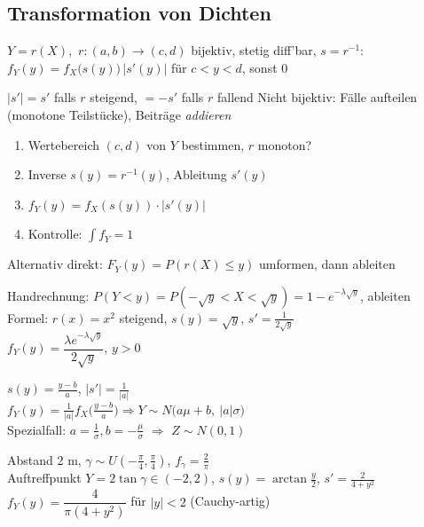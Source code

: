 \subsection{Transformation von Dichten}
\begin{formel}
$Y=r(X)$,\ $r:(a,b)\to(c,d)$ bijektiv, stetig diff'bar, $s=r^{-1}$:\\[1pt]
$f_Y(y)=f_X\big(s(y)\big)\,|s'(y)|$ für $c<y<d$, sonst 0
\end{formel}
\begin{itemize}
\pfeil $|s'|=s'$ falls $r$ steigend, $=-s'$ falls $r$ fallend
\pfeil Nicht bijektiv: Fälle aufteilen (monotone Teilstücke), Beiträge \emph{addieren}
\end{itemize}
\begin{merke}[{{Rechenschema}}]
\begin{enumerate}[label=\arabic*.,leftmargin=*]
\item Wertebereich $(c,d)$ von $Y$ bestimmen, $r$ monoton?
\item Inverse $s(y)=r^{-1}(y)$, Ableitung $s'(y)$
\item $f_Y(y)=f_X(s(y))\cdot|s'(y)|$
\item Kontrolle: $\int f_Y=1$
\end{enumerate}
\begin{itemize}
\pfeil Alternativ direkt: $F_Y(y)=P(r(X)\le y)$ umformen, dann ableiten
\end{itemize}
\end{merke}
\begin{bsp}[{{$Y=X^2$, $X\sim$ Exp$(\lambda)$ (4.3.4, 4.3.6)}}]
Handrechnung: $P(Y<y)=P(-\sqrt y<X<\sqrt y)=1-e^{-\lambda\sqrt y}$, ableiten\\
Formel: $r(x)=x^2$ steigend, $s(y)=\sqrt y$, $s'=\frac1{2\sqrt y}$\\
$f_Y(y)=\dfrac{\lambda e^{-\lambda\sqrt y}}{2\sqrt y}$, $y>0$
\end{bsp}
\begin{bsp}[{{Affin: $X\sim N(\mu,\sigma)$, $Y=aX+b$ (4.3.7)}}]
$s(y)=\frac{y-b}a$, $|s'|=\frac1{|a|}$\\
$f_Y(y)=\frac1{|a|}f_X\big(\tfrac{y-b}a\big)\Rightarrow Y\sim N\big(a\mu+b,\ |a|\sigma\big)$\\
Spezialfall: $a=\frac1\sigma,b=-\frac\mu\sigma$ $\Rightarrow$ $Z\sim N(0,1)$
\end{bsp}
\begin{bsp}
Abstand 2 m, $\gamma\sim U(-\frac\pi4,\frac\pi4)$, $f_\gamma=\frac2\pi$\\
Auftreffpunkt $Y=2\tan\gamma\in(-2,2)$, $s(y)=\arctan\frac y2$, $s'=\frac{2}{4+y^2}$\\
$f_Y(y)=\dfrac{4}{\pi(4+y^2)}$ für $|y|<2$ (Cauchy-artig)
\end{bsp}
